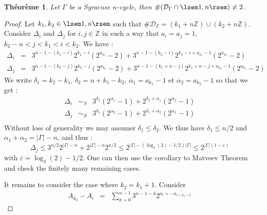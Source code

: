 \documentclass[12pt,a4paper]{article}
\newtheorem{theo}{Théorème}
\def\ZZ{\mathbb{Z}}
\def\D{\mathcal{D}}
\begin{document}
\begin{theo} Let $\Gamma$ be a Syracuse $n$-cycle, then $\#(\D_\Gamma\cap \lsem 1,n\rsem)\neq 2$.
\end{theo}
\begin{proof} Let $k_1,k_2\in\lsem 1,n\rsem$ such that $\#\D_\Gamma=(k_1+n\ZZ)\cup(k_2+n\ZZ)$.  Consider $\Delta_i$ and $\Delta_j$ for $i,j\in \ZZ$ in such a way that $a_i=a_j=1$, $k_2-n< j<k_1<i < k_2$. 
We have : 
\begin{eqnarray}
\Delta_i&=&  3^{n-1-(k_1-i)}2^{k_1-i}\left(2^{a_{k_1}}-2\right)
	+3^{n-1-(k_2-i)}2^{k_2-i+a_{k_1}-1}\left(2^{a_{k_2}}-2\right)\\
\Delta_j&=&  3^{n-1-(k_2-j)}2^{k_2-j}\left(2^{a_{k_2}}-2\right)
+3^{n-1-(k_1+n-j)}2^{k_1+n-j+a_{k_2}-1}\left(2^{a_{k_1}}-2\right)
\end{eqnarray} 
We write $\delta_1 = k_2-k_1 $, $\delta_2 = n+k_1-k_2$, $\alpha_1 = a_{k_1}-1$ et $\alpha_2=a_{k_2}-1$ so that we get : 
\begin{eqnarray}
\Delta_i&\sim_S&  3^{\delta_2}\left(2^{\alpha_1}-1\right)
	+2^{\delta_2+\alpha_1}\left(2^{\alpha_2}-1\right)\\
\Delta_j&\sim_S&  3^{\delta_1}\left(2^{\alpha_2}-1\right)
	+2^{\delta_1+\alpha_2}\left(2^{\alpha_1}-1\right)\\
\end{eqnarray} 
Without loss of generality we may assumer $\delta_1\leq\delta_2$. We thus have $\delta_1\leq n/2$ and $\alpha_1+\alpha_2 = |\Gamma|-n$, and thus : 
$$ \Delta_j \leq 3^{n/2}2^{|\Gamma|-n}+ 2^{|\Gamma|-n}2^{n/2}\leq 2^{|\Gamma|-(\log_3(2)-1/2)|\Gamma|}\leq 2^{|\Gamma|(1-\varepsilon)}$$
with $\varepsilon=\log_3(2)-1/2$.
One can then use the corollary to Matveev Theorem and check the finitely many remaining cases.

It remains to consider the case where $k_2=k_1+1$. 
Consider
\begin{eqnarray}
A_{k_2}-A_i &=& \sum_{k=0}^{n-1}3^{n-1-k}2^{a_i+\cdots a_{i+k_2-1}}
\end{eqnarray}

\end{proof}
\end{document}
